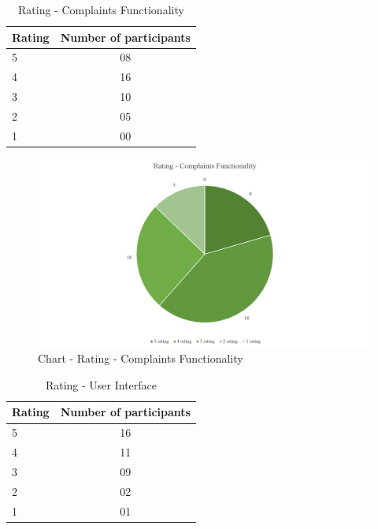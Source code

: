 \documentclass[12pt, oneside]{report}
\begin{document}
\begin {itemize}
\begin{table} [h]
\centering
\begin{tabular}{|l|c|}
\hline
Rating & Number of participants \\
\hline
5	&08 \\
4	&16 \\
3	&10 \\
2	&05 \\
1	&00 \\
\hline
\end{tabular}
\caption{Rating - Complaints Functionality}
\label{table-survey-rating-ComplaintsFunctionality}
\end{table}

\begin {figure} [h]
\centering
\includegraphics [scale=0.5] {ratingComplaintsFunctionality}
\caption [Chart - Rating - Complaints Functionality] {Chart - Rating - Complaints Functionality}
\label {image-ratingComplaintsFunctionality}
\end {figure}

\begin{table} [h]
\centering
\begin{tabular}{|l|c|}
\hline
Rating & Number of participants \\
\hline
5	&16 \\
4	&11 \\
3	&09 \\
2	&02 \\
1	&01 \\
\hline
\end{tabular}
\caption{Rating - User Interface}
\label{table-survey-rating-UserInterface}
\end{table}


\end{itemize}
\end{document}
